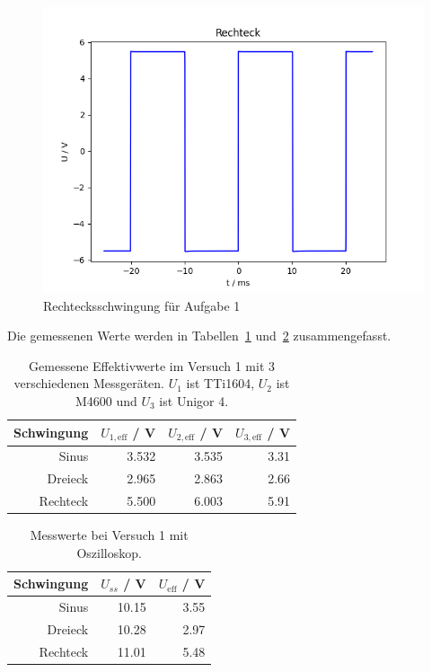 \documentclass{article}
\begin{document}
\begin{figure}[H]
\centering
\caption{Rechtecksschwingung für Aufgabe 1}
\label{fig:task1_rechteck}
\includegraphics[scale=0.5]{bilder/task1_rechteck.png}
\end{figure}


Die gemessenen Werte werden in Tabellen~\ref{tab:messung_task1_volt} und~\ref{tab:messung_task1_oszi} zusammengefasst.

\begin{table}[H]
\centering
\caption{Gemessene Effektivwerte im Versuch 1 mit 3 verschiedenen Messgeräten. $U_1$ ist TTi1604, $U_2$ ist M4600 und $U_3$ ist Unigor 4.}
\label{tab:messung_task1_volt}
\begin{tabular}{r|rrr}
Schwingung & $U_{1,\text{eff}}$ / V  & $U_{2,\text{eff}}$ / V & $U_{3,\text{eff}}$ / V \\
\hline
Sinus & 3.532 & 3.535 & 3.31 \\
Dreieck & 2.965 & 2.863 & 2.66 \\
Rechteck & 5.500 & 6.003 & 5.91
\end{tabular}
\end{table}


\begin{table}[H]
\centering
\caption{Messwerte bei Versuch 1 mit Oszilloskop.}
\label{tab:messung_task1_oszi}
\begin{tabular}{r|rr}
Schwingung &  $U_{ss}$ / V &  $U_\text{eff}$ / V  \\
\hline
Sinus & 10.15 & 3.55 \\
Dreieck & 10.28 & 2.97 \\
Rechteck & 11.01 & 5.48
\end{tabular}
\end{table}
\end{document}
